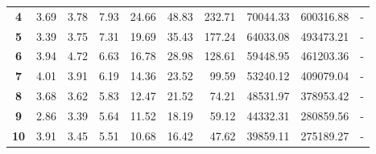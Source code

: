 \begin{table}[h]
\begin{center}
{\begin{tabular}{crrrrrrrrr}
\textbf{4}                         & 3.69                           & 3.78                           & 7.93                        & 24.66                          & 48.83                           & 232.71                          & 70044.33                        & 600316.88                        & -                                \\
\textbf{5}                         & 3.39                           & 3.75                         & 7.31                       & 19.69                          & 35.43                           & 177.24                          & 64033.08                        & 493473.21                        & -                                \\
\textbf{6}                         & 3.94                           & 4.72                          & 6.63                         & 16.78                          & 28.98                           & 128.61                          & 59448.95                        & 461203.36                        & -                                \\
\textbf{7}                         & 4.01                           & 3.91                          & 6.19                        & 14.36                          & 23.52                           & 99.59                           & 53240.12                        & 409079.04                        & -                                \\
\textbf{8}                         & 3.68                           & 3.62                           & 5.83                        & 12.47                          & 21.52                           & 74.21                           & 48531.97                        & 378953.42                        & -                                \\
\textbf{9}                         & 2.86                           & 3.39                          & 5.64                        & 11.52                          & 18.19                           & 59.12                           & 44332.31                        & 280859.56                        & -                                \\
\textbf{10}                        & 3.91                           & 3.45                           & 5.51                           & 10.68                          & 16.42                           & 47.62                           & 39859.11                       & 275189.27                        & -                                \\

\end{tabular}}
\end{center}
\end{table}
